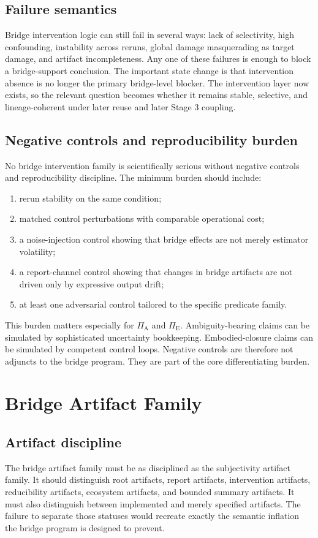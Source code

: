 \documentclass[11pt,a4paper]{article}
\theoremstyle{definition}
\newcommand{\PiA}{\Pi_{\mathrm{A}}}
\newcommand{\PiE}{\Pi_{\mathrm{E}}}
\begin{document}
\subsection{Failure semantics}
Bridge intervention logic can still fail in several ways: lack of selectivity, high confounding, instability across reruns, global damage masquerading as target damage, and artifact incompleteness. Any one of these failures is enough to block a bridge-support conclusion. The important state change is that intervention absence is no longer the primary bridge-level blocker. The intervention layer now exists, so the relevant question becomes whether it remains stable, selective, and lineage-coherent under later reuse and later Stage 3 coupling.

\subsection{Negative controls and reproducibility burden}
No bridge intervention family is scientifically serious without negative controls and reproducibility discipline. The minimum burden should include:
\begin{enumerate}[leftmargin=1.5em]
\item rerun stability on the same condition;
\item matched control perturbations with comparable operational cost;
\item a noise-injection control showing that bridge effects are not merely estimator volatility;
\item a report-channel control showing that changes in bridge artifacts are not driven only by expressive output drift;
\item at least one adversarial control tailored to the specific predicate family.
\end{enumerate}

This burden matters especially for $\PiA$ and $\PiE$. Ambiguity-bearing claims can be simulated by sophisticated uncertainty bookkeeping. Embodied-closure claims can be simulated by competent control loops. Negative controls are therefore not adjuncts to the bridge program. They are part of the core differentiating burden.

\section{Bridge Artifact Family}
\subsection{Artifact discipline}
The bridge artifact family must be as disciplined as the subjectivity artifact family. It should distinguish root artifacts, report artifacts, intervention artifacts, reducibility artifacts, ecosystem artifacts, and bounded summary artifacts. It must also distinguish between implemented and merely specified artifacts. The failure to separate those statuses would recreate exactly the semantic inflation the bridge program is designed to prevent.
\end{document}
